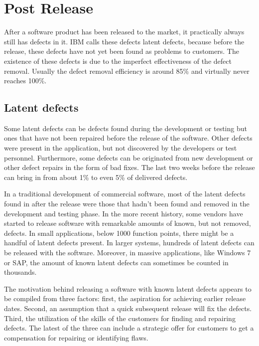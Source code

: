 \section{Post Release}
\label{sec:post_release}

After a software product has been released to the market, it practically always still has defects in it. IBM calls these defects latent defects, because before the release, these defects have not yet been found as problems to customers. The existence of these defects is due to the imperfect effectiveness of the defect removal. Usually the defect removal efficiency is around 85\% and virtually never reaches 100\%.

\subsection{Latent defects}

Some latent defects can be defects found during the development or testing but ones that have not been repaired before the release of the software. Other defects were present in the application, but not discovered by the developers or test personnel. Furthermore, some defects can be originated from new development or other defect repairs in the form of bad fixes. The last two weeks before the release can bring in from about 1\% to even 5\% of delivered defects.

In a traditional development of commercial software, most of the latent defects found in after the release were those that hadn't been found and removed in the development and testing phase. In the more recent history, some vendors have started to release software with remarkable amounts of known, but not removed, defects. In small applications, below 1000 function points, there might be a handful of latent defects present. In larger systems, hundreds of latent defects can be released with the software. Moreover, in massive applications, like Windows 7 or SAP, the amount of known latent defects can sometimes be counted in thousands.

The motivation behind releasing a software with known latent defects appears to be compiled from three factors: first, the aspiration for achieving earlier release dates. Second, an assumption that a quick subsequent release will fix the defects. Third, the utilization of the skills of the customers for finding and repairing defects. The latest of the three can include a strategic offer for customers to get a compensation for repairing or identifying flaws.

